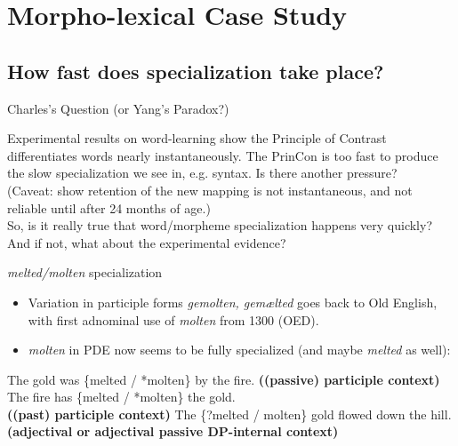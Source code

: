 \documentclass[hyperref={pdfpagelabels=false}]{beamer}
\begin{document}
\section{Morpho-lexical Case Study}
\subsection{How fast does specialization take place?}

\begin{frame}{Charles's Question (or Yang's Paradox?)}
		\begin{center}
			Experimental results on word-learning show the Principle of Contrast differentiates words nearly instantaneously. The PrinCon is too fast to produce the slow specialization we see in, e.g. syntax. Is there another pressure?\\
			\vspace*{2mm}
			\small{(Caveat: \citet{bionetal2013} show retention of the new mapping is not instantaneous, and not reliable until after 24 months of age.)}\\
			\vspace*{5mm}
			\large{So, is it really true that word/morpheme specialization happens very quickly? And if not, what about the experimental evidence?}
		\end{center}
\end{frame}



\begin{frame}{\textsl{melted/molten} specialization}
\begin{itemize}
\item Variation in participle forms \textsl{gemolten, gemælted} goes back to Old English, with first adnominal use of \textsl{molten} from 1300 (OED).
\item \textsl{molten} in PDE now seems to be fully specialized (and maybe \textsl{melted} as well):
\end{itemize}
\begin{exe}
	\ex The gold was \{melted / *molten\} by the fire. \textbf{((passive) participle context)}
	\ex The fire has  \{melted / *molten\} the gold.\\\textbf{((past) participle context)}
	\ex The \{?melted / molten\} gold flowed down the hill. \textbf{(adjectival or adjectival passive DP-internal context)}
\end{exe}

\end{frame}
\end{document}
